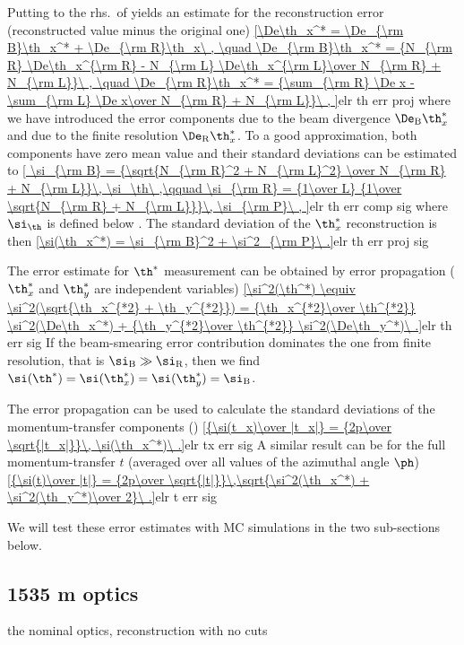 Putting  to the rhs.~of yields an estimate for the reconstruction error (reconstructed value minus the original one)
\eqref{\De\th_x^* = \De_{\rm B}\th_x^* + \De_{\rm R}\th_x\ ,
	\quad \De_{\rm B}\th_x^* = {N_{\rm R} \De\th_x^{\rm R} - N_{\rm L} \De\th_x^{\rm L}\over N_{\rm R} + N_{\rm L}}\ ,
	\quad \De_{\rm R}\th_x^* = {\sum_{\rm R} \De x - \sum_{\rm L} \De x\over  N_{\rm R} + N_{\rm L}}\ ,
}{elr th err proj}
where we have introduced the error components due to the beam divergence $\De_{\rm B}\th_x^*$ and due to the finite resolution $\De_{\rm R}\th_x^*$. To a good approximation, both components have zero mean value and their standard deviations can be estimated to
\eqref{
	\si_{\rm B} = {\sqrt{N_{\rm R}^2 + N_{\rm L}^2} \over N_{\rm R} + N_{\rm L}}\, \si_\th\ ,\qquad
	\si_{\rm R} = {1\over L} {1\over \sqrt{N_{\rm R} + N_{\rm L}}}\, \si_{\rm P}\ ,
}{elr th err comp sig}
where $\si_\th$ is defined below . The standard deviation of the $\th_x^*$ reconstruction is then
\eqref{\si(\th_x^*) = \si_{\rm B}^2 + \si^2_{\rm P}\ .}{elr th err proj sig}

The error estimate for $\th^*$ measurement can be obtained by error propagation ($\th_x^*$ and $\th_y^*$ are independent variables)
\eqref{\si^2(\th^*) \equiv \si^2(\sqrt{\th_x^{*2} + \th_y^{*2}}) = {\th_x^{*2}\over \th^{*2}} \si^2(\De\th_x^*) + {\th_y^{*2}\over \th^{*2}} \si^2(\De\th_y^*)\ .}{elr th err sig}
If the beam-smearing error contribution dominates the one from finite resolution, that is $\si_{\rm B} \gg \si_{\rm R}$, then we find $\si(\th^*) = \si(\th_x^*) = \si(\th_y^*) = \si_{\rm B}$.

The error propagation can be used to calculate the standard deviations of the momentum-transfer components ()
\eqref{{\si(t_x)\over |t_x|} = {2p\over \sqrt{|t_x|}}\, \si(\th_x^*)\ .}{elr tx err sig}
A similar result can be for the full momentum-transfer $t$ (averaged over all values of the azimuthal angle $\ph$)
\eqref{{\si(t)\over |t|} = {2p\over \sqrt{|t|}}\,\sqrt{\si^2(\th_x^*) + \si^2(\th_y^*)\over 2}\ .}{elr t err sig}

We will test these error estimates with MC simulations in the two sub-sections below.


\subsection[elr 1535]{1535 m optics}

\> the nominal optics, 
\> reconstruction with no cuts

